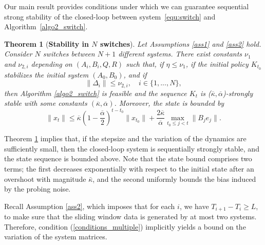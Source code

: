 \documentclass[letterpaper, 10 pt, conference]{ieeeconf}  %
\newtheorem{theorem}{Theorem}
\begin{document}
Our main result provides conditions under which we can guarantee sequential strong stability of the closed-loop between system~\eqref{equ:switch} and Algorithm~\ref{algo2_switch}.
\begin{theorem}[\textbf{Stability in $N$ switches}]
\label{theorem_multiple_switch}
Let Assumptions \ref{ass1} and \ref{ass2} hold.
Consider $N$ switches between $N+1$ different systems. There exist constants $\nu_1$ and $\nu_{2,i}$ depending on $(A_i, B_i, Q, R)$ such that, if $\eta \leq \nu_1$, if the initial policy $K_{t_0}$ stabilizes the initial system $(A_0, B_0)$, and if
\begin{equation}
\label{conditions_multiple}
    \|\Delta_i\| \leq \nu_{2,i}, \quad i\in \{1,..., N\},
\end{equation}
then Algorithm \ref{algo2_switch} is feasible and the sequence $K_t$ is ($\overline{\kappa}, \overline{\alpha}$)-strongly stable with some constants $(\overline{\kappa}, \overline{\alpha})$. Moreover, the state is bounded by    
\begin{equation}
    \|x_t\| \leq \overline{\kappa} (1-\frac{\overline{\alpha}}{2})^{t-t_0}\|x_{t_0}\| +\frac{2\overline{\kappa}}{\overline{\alpha}} \underset{t_0\leq j < t}{\max} \|B_j e_j\|.
\end{equation}
\end{theorem} \vspace{2mm}

Theorem \ref{theorem_multiple_switch} implies that, if the stepsize  and the variation of the dynamics are sufficiently small, then the closed-loop system is sequentially strongly stable, and the state sequence is bounded above. Note that the state bound comprises two terms; the first decreases exponentially with respect to the initial state after an overshoot with magnitude $\bar{\kappa}$, and the second uniformly bounds the bias induced by the probing noise.


Recall Assumption \ref{ass2}, which imposes that for each $i$, we have $T_{i+1}-T_i \geq L$, to make sure that the sliding window data is generated by at most two systems. Therefore, condition (\ref{conditions_multiple}) implicitly yields a bound on the variation of the system matrices.  
\end{document}
